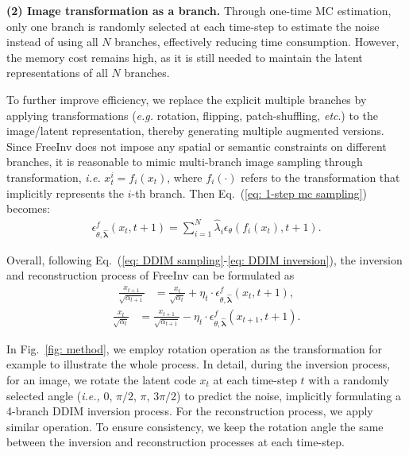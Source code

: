 \documentclass{article}
\begin{document}
\textbf{(2) Image transformation as a branch.} 
Through one-time MC estimation, only one branch is randomly selected at each time-step to estimate the noise instead of using all $N$ branches, effectively reducing time consumption.
However, the memory cost remains high, as it is still needed to maintain the latent representations of all $N$ branches.

To further improve efficiency, we replace the explicit multiple branches by applying transformations (\emph{e.g.} rotation, flipping, patch-shuffling, \emph{etc}.) to the image/latent representation, thereby generating multiple augmented versions. 
Since FreeInv does not impose any spatial or semantic constraints on different branches, it is reasonable to mimic multi-branch image sampling through transformation, \emph{i.e.} $x_{t}^{i}=f_i(x_t)$, where $f_i(\cdot)$ refers to the transformation that implicitly represents the $i$-th branch.
Then Eq.~(\ref{eq: 1-step mc sampling}) becomes:
\begin{align}
    \epsilon_{\theta, \hat{\boldsymbol{\lambda}}}^{f}\left(x_{t}, t+1\right) = \sum_{i=1}^{N}\hat{\lambda}_{i}\epsilon_{\theta}\left(f_{i}\left(x_{t}\right), t+1\right).
\label{eq: final}
\end{align}




Overall, following Eq.~(\ref{eq: DDIM sampling}-\ref{eq: DDIM inversion}), the inversion and reconstruction process of FreeInv can be formulated as
\begin{align}
    \frac{x_{t+1}}{\sqrt{\alpha_{t+1}}} &= \frac{x_t}{\sqrt{\alpha_t}}+\eta_t \cdot \epsilon_{\theta, \hat{\boldsymbol{\lambda}}}^{f}\left(x_{t}, t+1\right), 
    \label{eq: freeinv inversion} %
\end{align}
\begin{align}    
    \frac{x_{t}}{\sqrt{\alpha_{t}}} &= \frac{x_{t+1}}{\sqrt{\alpha_{t+1}}}-\eta_t \cdot \epsilon_{\theta, \hat{\boldsymbol{\lambda}}}^{f}\left(x_{t+1}, t+1\right). 
\label{eq: freeinv reconstruction}
\end{align}


In Fig.~\ref{fig: method}, we employ rotation operation as the transformation for example to illustrate the whole process.
In detail, during the inversion process, for an image, we rotate the latent code $x_t$ at each time-step $t$ with a randomly selected angle (\emph{i.e.,} 0, $\pi/2$, $\pi$, $3\pi/2$) to predict the noise, 
implicitly formulating a 4-branch DDIM inversion process.
For the reconstruction process, we apply similar operation.
To ensure consistency, we keep the rotation angle the same between the inversion and reconstruction processes at each time-step.
\end{document}
